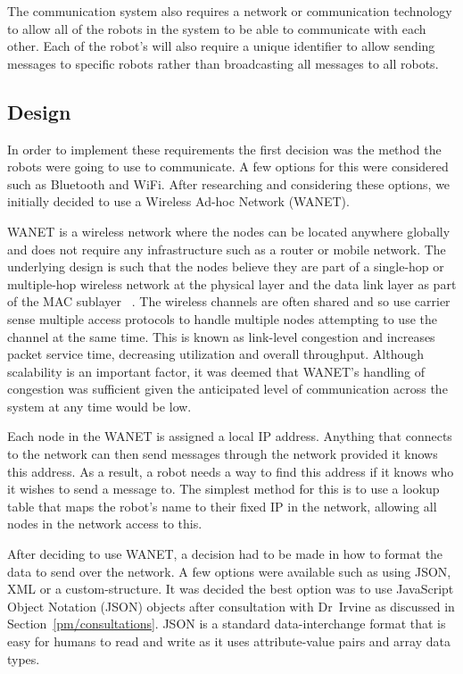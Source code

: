The communication system also requires a network or communication
technology to allow all of the robots in the system to be able to
communicate with each other. Each of the robot's will also require
a unique identifier to allow sending messages to specific robots
rather than broadcasting all messages to all robots.

\subsection{Design}\label{soft/comms/design}
In order to implement these requirements the first decision was the
method the robots were going to use to communicate. A few options
for this were considered such as Bluetooth and WiFi. After
researching  and considering these options, we initially decided to
use a Wireless Ad-hoc Network (WANET).

WANET is a wireless network where the nodes can be located anywhere
globally and does not require any infrastructure such as a router or
mobile network. The underlying design is such that the nodes believe
they are part of a single-hop or multiple-hop wireless network at the
physical layer and the data link layer as part of the MAC sublayer~
\cite{rajesh2015congestion}. The wireless channels are often shared
and so use carrier sense multiple access protocols to handle multiple
nodes attempting to use the channel at the same time. This is known
as link-level congestion and increases packet service time,
decreasing utilization and overall throughput. Although scalability
is an important  factor, it was deemed that WANET's handling of
congestion was sufficient given the anticipated level of
communication across the system at any time would be low.

Each node in the WANET is assigned a local IP address.
Anything that connects to the network can then send messages through
the network provided it knows this address. As a result, a robot
needs a way to find this address if it knows who it wishes to send
a message to. The simplest method for this is to use a lookup table
that maps the robot's name to their fixed IP in the network, allowing
all nodes in the network access to this.

After deciding to use WANET, a decision  had to be made in how to format
the data to send over the network. A few options were available such as
using JSON, XML or a custom-structure. It was decided the best option was
to use JavaScript Object Notation (JSON) objects after consultation with
Dr~Irvine as discussed in Section~\ref{pm/consultations}. JSON is a
standard data-interchange format that is easy for humans to read and write
as it uses attribute-value pairs and array data types.

